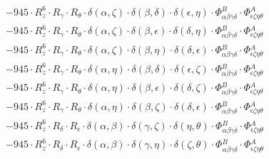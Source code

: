 \documentclass{article}
\begin{document}
\begin{equation}
\begin{array}{c}
 \\[0.2em] 		 - 945 \cdot R_{z}^{6} \cdot R_{\gamma{}} \cdot R_{\theta{}} \cdot \delta{}\left(\alpha{}, \zeta{}\right) \cdot \delta{}\left(\beta{}, \delta{}\right) \cdot \delta{}\left(\epsilon{}, \eta{}\right) \cdot \Phi{}^{B}_{\alpha{}\beta{}\gamma{}\delta{}} \cdot \Phi{}^{A}_{\epsilon{}\zeta{}\eta{}\theta{}} 
 \\[0.2em] 		 - 945 \cdot R_{z}^{6} \cdot R_{\gamma{}} \cdot R_{\theta{}} \cdot \delta{}\left(\alpha{}, \zeta{}\right) \cdot \delta{}\left(\beta{}, \epsilon{}\right) \cdot \delta{}\left(\delta{}, \eta{}\right) \cdot \Phi{}^{B}_{\alpha{}\beta{}\gamma{}\delta{}} \cdot \Phi{}^{A}_{\epsilon{}\zeta{}\eta{}\theta{}} 
 \\[0.2em] 		 - 945 \cdot R_{z}^{6} \cdot R_{\gamma{}} \cdot R_{\theta{}} \cdot \delta{}\left(\alpha{}, \zeta{}\right) \cdot \delta{}\left(\beta{}, \eta{}\right) \cdot \delta{}\left(\delta{}, \epsilon{}\right) \cdot \Phi{}^{B}_{\alpha{}\beta{}\gamma{}\delta{}} \cdot \Phi{}^{A}_{\epsilon{}\zeta{}\eta{}\theta{}} 
 \\[0.2em] 		 - 945 \cdot R_{z}^{6} \cdot R_{\gamma{}} \cdot R_{\theta{}} \cdot \delta{}\left(\alpha{}, \eta{}\right) \cdot \delta{}\left(\beta{}, \delta{}\right) \cdot \delta{}\left(\epsilon{}, \zeta{}\right) \cdot \Phi{}^{B}_{\alpha{}\beta{}\gamma{}\delta{}} \cdot \Phi{}^{A}_{\epsilon{}\zeta{}\eta{}\theta{}} 
 \\[0.2em] 		 - 945 \cdot R_{z}^{6} \cdot R_{\gamma{}} \cdot R_{\theta{}} \cdot \delta{}\left(\alpha{}, \eta{}\right) \cdot \delta{}\left(\beta{}, \epsilon{}\right) \cdot \delta{}\left(\delta{}, \zeta{}\right) \cdot \Phi{}^{B}_{\alpha{}\beta{}\gamma{}\delta{}} \cdot \Phi{}^{A}_{\epsilon{}\zeta{}\eta{}\theta{}} 
 \\[0.2em] 		 - 945 \cdot R_{z}^{6} \cdot R_{\gamma{}} \cdot R_{\theta{}} \cdot \delta{}\left(\alpha{}, \eta{}\right) \cdot \delta{}\left(\beta{}, \zeta{}\right) \cdot \delta{}\left(\delta{}, \epsilon{}\right) \cdot \Phi{}^{B}_{\alpha{}\beta{}\gamma{}\delta{}} \cdot \Phi{}^{A}_{\epsilon{}\zeta{}\eta{}\theta{}} 
 \\[0.2em] 		 - 945 \cdot R_{z}^{6} \cdot R_{\delta{}} \cdot R_{\epsilon{}} \cdot \delta{}\left(\alpha{}, \beta{}\right) \cdot \delta{}\left(\gamma{}, \zeta{}\right) \cdot \delta{}\left(\eta{}, \theta{}\right) \cdot \Phi{}^{B}_{\alpha{}\beta{}\gamma{}\delta{}} \cdot \Phi{}^{A}_{\epsilon{}\zeta{}\eta{}\theta{}} 
 \\[0.2em] 		 - 945 \cdot R_{z}^{6} \cdot R_{\delta{}} \cdot R_{\epsilon{}} \cdot \delta{}\left(\alpha{}, \beta{}\right) \cdot \delta{}\left(\gamma{}, \eta{}\right) \cdot \delta{}\left(\zeta{}, \theta{}\right) \cdot \Phi{}^{B}_{\alpha{}\beta{}\gamma{}\delta{}} \cdot \Phi{}^{A}_{\epsilon{}\zeta{}\eta{}\theta{}} 

\end{array}
\end{equation}
\end{document}
